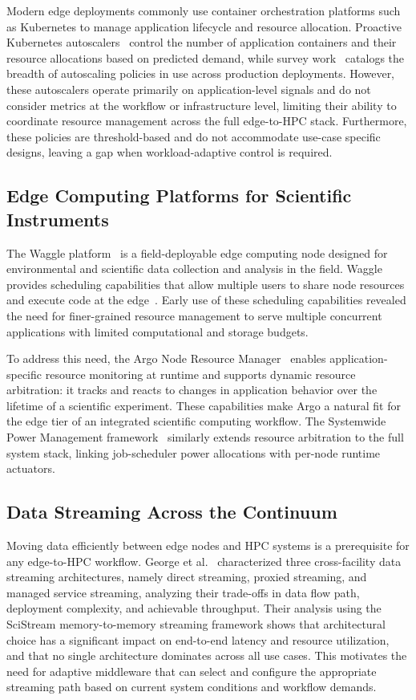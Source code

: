 Modern edge deployments commonly use container orchestration platforms such as
Kubernetes to manage application lifecycle and resource allocation.
Proactive Kubernetes autoscalers~\cite{ju2021proactive} control the number of
application containers and their resource allocations based on predicted demand,
while survey work~\cite{tran2022survey} catalogs the breadth of autoscaling
policies in use across production deployments.
However, these autoscalers operate primarily on application-level signals and do
not consider metrics at the workflow or infrastructure level, limiting their
ability to coordinate resource management across the full edge-to-HPC stack.
Furthermore, these policies are threshold-based and do not accommodate use-case
specific designs, leaving a gap when workload-adaptive control is required.

\subsection{Edge Computing Platforms for Scientific Instruments}

The Waggle platform~\cite{beckman2016waggle} is a field-deployable edge computing
node designed for environmental and scientific data collection and analysis in the
field.
Waggle provides scheduling capabilities that allow multiple users to share node
resources and execute code at the edge~\cite{kim2022goal}.
Early use of these scheduling capabilities revealed the need for finer-grained
resource management to serve multiple concurrent applications with limited
computational and storage budgets.

To address this need, the Argo Node Resource Manager~\cite{argo-ipdps-2019}
enables application-specific resource monitoring at runtime and supports dynamic
resource arbitration: it tracks and reacts to changes in application behavior over
the lifetime of a scientific experiment.
These capabilities make Argo a natural fit for the edge tier of an integrated
scientific computing workflow.
The Systemwide Power Management framework~\cite{Ellsworth:16:Systemwide} similarly
extends resource arbitration to the full system stack, linking job-scheduler power
allocations with per-node runtime actuators.

\subsection{Data Streaming Across the Continuum}

Moving data efficiently between edge nodes and HPC systems is a prerequisite for
any edge-to-HPC workflow.
George et al.~\cite{george2025edge2hpc} characterized three cross-facility data
streaming architectures, namely direct streaming, proxied streaming, and managed
service streaming, analyzing their trade-offs in data flow path, deployment
complexity, and achievable throughput.
Their analysis using the SciStream memory-to-memory streaming framework shows that
architectural choice has a significant impact on end-to-end latency and resource
utilization, and that no single architecture dominates across all use cases.
This motivates the need for adaptive middleware that can select and configure the
appropriate streaming path based on current system conditions and workflow demands.

